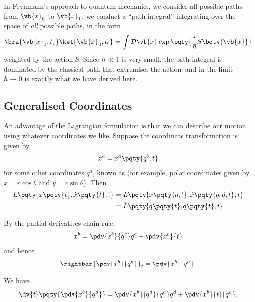 \begin{remarks}
\begin{enumerate}[label=(\roman*)]
        In Feynmann's approach to quantum mechanics, we consider all possible paths from \(\vb{x}_0\) to \(\vb{x}_1\), we conduct a ``path integral'' integrating over the space of \emph{all} possible paths, in the form
        \[
            \bra{\vb{x}_1, t_1} \ket{\vb{x}_0, t_0} = \int \mathcal{D}\vb{x} \exp\pqty{\frac{i}{\hbar} S\bqty{\vb{x}}}
        \]
        weighted by the action \(S\). Since \(\hbar \ll 1\) is very small, the path integral is dominated by the classical path that extremises the action, and in the limit \(\hbar \to 0\) is exactly what we have derived here.
    \end{enumerate}
\end{remarks}

\subsection{Generalised Coordinates}

An advantage of the Lagrangian formulation is that we can describe our motion using whatever coordinates we like. Suppose the coordinate transformation is given by
\begin{equation}
    x^a = x^a \pqty{q^b, t}
\end{equation}
for some other coordinates \(q^a\), known as  (for example, polar coordinates given by \(x = r \cos \theta\) and \(y = r \sin \theta\)). Then
\begin{subequations}
    \begin{align}
        L\pqty{x\pqty{t}, \dot{x}\pqty{t}, t} &= L\pqty{x\pqty{q, t}, \dot{x}\pqty{q, \dot{q}, t}, t} \\
        &= \tilde{L}\pqty{q\pqty{t}, \dot{q}\pqty{t}, t}
    \end{align}
\end{subequations}

By the partial derivatives chain rule,
\begin{equation}
    \label{eq:xdot-chain-rule-in-qdot}%
    \dot{x}^b = \pdv{x^b}{q^c} \dot{q}^c + \pdv{x^b}{t}
\end{equation}
and hence
\begin{equation}
    \label{eq:xdot-qdot-partial}%
    \rightbar{\pdv{\dot{x}^b}{\dot{q}^a}}_{t} = \pdv{x^b}{q^a}.
\end{equation}

We have
\begin{equation}
    \label{eq:x-q-partial-time}%
    \dv{t} \pqty{\pdv{x^b}{q^a}} = \pdv{x^b}{q^d}{q^a} \dot{q}^d + \pdv{x^b}{t}{q^a}.
\end{equation}

